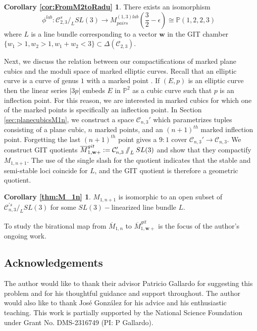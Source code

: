 \documentclass{amsart}
\newcommand{\Pj}{\mathbb{P}}
\newcommand{\mc}{\mathcal}
\newcommand{\sslash}{\mathbin{/\mkern-6mu/}}
\numberwithin{equation}{section}
\theoremstyle{definition}
\begin{document}
\newtheorem*{cor:FromM2toRadu}{Corollary \ref{cor:FromM2toRadu}}
\begin{cor:FromM2toRadu}
    There exists an isomorphism
    \[
       \phi^{lab}:\mc{C}_{2,3}^s \slash_{L} SL(3) \rightarrow M^{(1,3)lab}_{pairs}\left(
       \frac{3}{2}- \epsilon
       \right) 
       \cong 
       \mathbb{P}(1,2,2,3)
    \]
    where $L$ is a line bundle corresponding to a vector $\mathbf{w}$ in the GIT chamber $\{ w_1 > 1, w_2 > 1, w_1 + w_2 < 3\} \subset \Delta(\mc{C}_{2,3})$.
\end{cor:FromM2toRadu}

Next, we discuss the relation between our compactifications of marked plane cubics and the moduli space of marked elliptic curves.  Recall that an elliptic curve is a curve of genus $1$ with a marked point \cite{Dol12}. If $(E,p)$ is an elliptic curve then the linear series $|3p|$ embeds $E$ in $\Pj^2$ as a cubic curve such that $p$ is an inflection point. For this reason, we are interested in marked cubics for which one of the marked points is specifically an inflection point. 
In Section \ref{sec:planecubicsM1n},  we construct a space $\mc{C}_{n,3}'$ which parametrizes tuples consisting of a plane cubic, $n$ marked points, and an $(n+1)^{th}$ marked inflection point. Forgetting the last $(n+1)^{th}$ point gives a $9:1$ cover $\mc{C}_{n,3}' \rightarrow \mc{C}_{n,3}$. We construct GIT quotients $\overline{M}^{git}_{1,\mathbf{w}+} := \mc{C}_{n,3}' \sslash_L SL(3)$ and show that they compactify $M_{1,n+1}$.
The use of the single slash for the quotient indicates that the stable and semi-stable loci coincide for $L$, and the GIT quotient is therefore a geometric quotient.

\newtheorem*{thm:M_1n}{Corollary \ref{thm:M_1n}}
\begin{thm:M_1n}
    $M_{1,n+1}$ is isomorphic to an open subset of $\mc{C}_{n,3}^{'s} \slash_L SL(3)$ for some $SL(3)-$linearized line bundle $L$.
\end{thm:M_1n}
To study the birational map from $\overline{M}_{1,n}$ to 
$\overline{M}^{git}_{1,\mathbf{w}+}$ 
is the focus of the author's ongoing work.  




\subsection*{Acknowledgements}
The author would like to thank their advisor Patricio Gallardo for suggesting this problem and for his thoughtful guidance and support throughout. The author would also like to thank Jos\'e Gonz\'alez for his advice and his enthusiastic teaching. This work is partially supported by the National Science Foundation under Grant No. DMS-2316749 (PI: P Gallardo).
\end{document}
